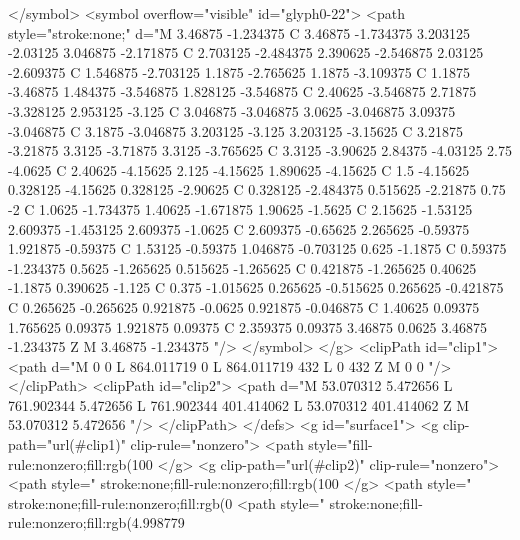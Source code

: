 </symbol>
<symbol overflow="visible" id="glyph0-22">
<path style="stroke:none;" d="M 3.46875 -1.234375 C 3.46875 -1.734375 3.203125 -2.03125 3.046875 -2.171875 C 2.703125 -2.484375 2.390625 -2.546875 2.03125 -2.609375 C 1.546875 -2.703125 1.1875 -2.765625 1.1875 -3.109375 C 1.1875 -3.46875 1.484375 -3.546875 1.828125 -3.546875 C 2.40625 -3.546875 2.71875 -3.328125 2.953125 -3.125 C 3.046875 -3.046875 3.0625 -3.046875 3.09375 -3.046875 C 3.1875 -3.046875 3.203125 -3.125 3.203125 -3.15625 C 3.21875 -3.21875 3.3125 -3.71875 3.3125 -3.765625 C 3.3125 -3.90625 2.84375 -4.03125 2.75 -4.0625 C 2.40625 -4.15625 2.125 -4.15625 1.890625 -4.15625 C 1.5 -4.15625 0.328125 -4.15625 0.328125 -2.90625 C 0.328125 -2.484375 0.515625 -2.21875 0.75 -2 C 1.0625 -1.734375 1.40625 -1.671875 1.90625 -1.5625 C 2.15625 -1.53125 2.609375 -1.453125 2.609375 -1.0625 C 2.609375 -0.65625 2.265625 -0.59375 1.921875 -0.59375 C 1.53125 -0.59375 1.046875 -0.703125 0.625 -1.1875 C 0.59375 -1.234375 0.5625 -1.265625 0.515625 -1.265625 C 0.421875 -1.265625 0.40625 -1.1875 0.390625 -1.125 C 0.375 -1.015625 0.265625 -0.515625 0.265625 -0.421875 C 0.265625 -0.265625 0.921875 -0.0625 0.921875 -0.046875 C 1.40625 0.09375 1.765625 0.09375 1.921875 0.09375 C 2.359375 0.09375 3.46875 0.0625 3.46875 -1.234375 Z M 3.46875 -1.234375 "/>
</symbol>
</g>
<clipPath id="clip1">
  <path d="M 0 0 L 864.011719 0 L 864.011719 432 L 0 432 Z M 0 0 "/>
</clipPath>
<clipPath id="clip2">
  <path d="M 53.070312 5.472656 L 761.902344 5.472656 L 761.902344 401.414062 L 53.070312 401.414062 Z M 53.070312 5.472656 "/>
</clipPath>
</defs>
<g id="surface1">
<g clip-path="url(#clip1)" clip-rule="nonzero">
<path style="fill-rule:nonzero;fill:rgb(100%
</g>
<g clip-path="url(#clip2)" clip-rule="nonzero">
<path style=" stroke:none;fill-rule:nonzero;fill:rgb(100%
</g>
<path style=" stroke:none;fill-rule:nonzero;fill:rgb(0%
<path style=" stroke:none;fill-rule:nonzero;fill:rgb(4.998779%
